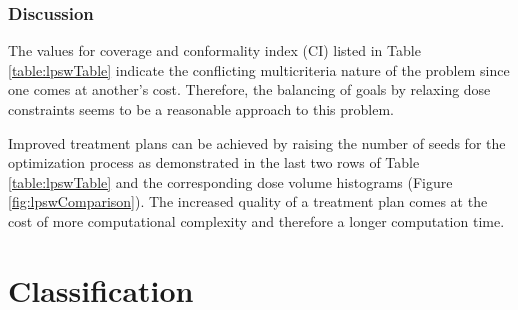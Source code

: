 \documentclass[12pt]{article}
\begin{document}
	\subsubsection{Discussion}
		The values for coverage and conformality index (CI) listed in Table \ref{table:lpswTable} indicate the conflicting multicriteria nature of the problem since one comes at another's cost. Therefore, the balancing of goals by relaxing dose constraints seems to be a reasonable approach to this problem.
			
		Improved treatment plans can be achieved by raising the number of seeds for the optimization process as demonstrated in the last two rows of Table \ref{table:lpswTable} and the corresponding dose volume histograms (Figure \ref{fig:lpswComparison}). The increased quality of a treatment plan comes at the cost of more computational complexity and therefore a longer computation time. 

\section{Classification}


\newpage


\end{document}

